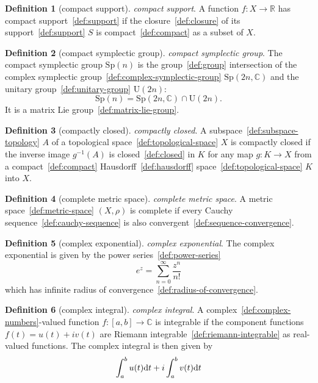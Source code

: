 \documentclass[12pt,a4paper]{article}
\theoremstyle{definition}
\newtheorem{definition}{Definition}
\begin{document}
\begin{definition}[compact support]\label{def:compact-support}
\emph{compact support}. A function $f: X\to\mathbb R$ has compact support~\ref{def:support} if the closure~\ref{def:closure} of its support~\ref{def:support} $S$ is compact~\ref{def:compact} as a subset of $X$.
\end{definition}

\begin{definition}[compact symplectic group]\label{def:compact-symplectic-group}
\emph{compact symplectic group}. The compact symplectic group $\text{Sp}(n)$ is the group~\ref{def:group} intersection of the complex symplectic group~\ref{def:complex-symplectic-group} $\text{Sp}(2n,\mathbb C)$ and the unitary group~\ref{def:unitary-group} $\text{U}(2n)$: $$\text{Sp}(n) = \text{Sp}(2n,\mathbb C)\cap\text{U}(2n).$$ It is a matrix Lie group~\ref{def:matrix-lie-group}.
\end{definition}

\begin{definition}[compactly closed]\label{def:compactly-closed}
\emph{compactly closed}. A subspace~\ref{def:subspace-topology} $A$ of a topological space~\ref{def:topological-space} $X$ is compactly closed if the inverse image $g^{-1}(A)$ is closed~\ref{def:closed} in $K$ for any map $g:K\to X$ from a compact~\ref{def:compact} Hausdorff~\ref{def:hausdorff} space~\ref{def:topological-space}  $K$ into $X$.
\end{definition}

\begin{definition}[complete metric space]\label{def:complete-metric-space}
\emph{complete metric space}. A metric space~\ref{def:metric-space} $(X,\rho)$ is complete if every Cauchy sequence~\ref{def:cauchy-sequence} is also convergent~\ref{def:sequence-convergence}.
\end{definition}

\begin{definition}[complex exponential]\label{def:complex-exponential}
\emph{complex exponential}. The complex exponential is given by the power series~\ref{def:power-series} $$e^z = \sum_{n=0}^\infty \frac{z^n}{n!}$$ which has infinite radius of convergence~\ref{def:radius-of-convergence}.
\end{definition}

\begin{definition}[complex integral]\label{def:complex-integral}
\emph{complex integral}. A complex~\ref{def:complex-numbers}-valued function $f:[a,b]\to\mathbb C$ is integrable if the component functions $f(t) = u(t)+iv(t)$ are Riemann integrable~\ref{def:riemann-integrable} as real-valued functions. The complex integral is then given by $$\int_a^b u(t)\text dt + i\int_a^b v(t)\text dt$$
\end{definition}
\end{document}
